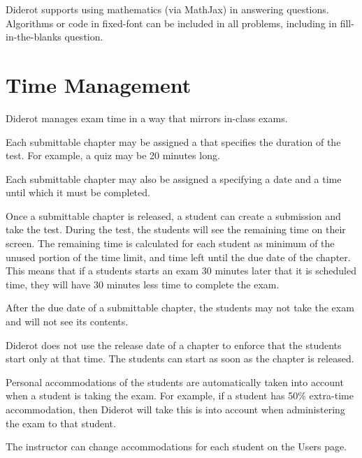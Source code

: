 Diderot supports using mathematics (via MathJax) in answering questions.  
%
Algorithms or code in fixed-font can be included in all problems, including in fill-in-the-blanks question.

\section{Time Management}
\label{ch:quiz::time-management}


\begin{gram}
Diderot manages exam time in a way that mirrors in-class exams.

Each submittable chapter may be assigned a  that
specifies the duration of the test.  For example, a quiz may be 20
minutes long.

Each submittable chapter may also be assigned a  specifying a date and a time until which it must be completed. 
\end{gram}

\begin{gram}
Once a submittable chapter is released, a student can create a submission and take the test.  During the test, the students will see the remaining time on their screen.  The remaining time is calculated for each student as minimum of the unused portion of the time limit, and time left until the due date of the chapter.  This means that if a students starts an exam 30 minutes later that it is scheduled time, they will have 30 minutes less time to complete the exam.

After the due date of a submittable chapter, the students may not take the exam and will not see its contents.

Diderot does not use the release date of a chapter to enforce that the students start only at that time.  The students can start as soon as the chapter is released.
\end{gram}


\begin{gram}[Accommodations]
Personal accommodations of the students are automatically taken into account when a student is taking the exam.  For example, if a student has 50\% extra-time accommodation, then Diderot will take this is into account when administering the exam to that student.  

The instructor can change accommodations for each student on the Users page. 
\end{gram}

